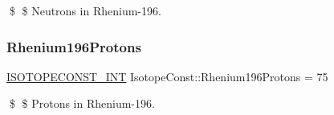 \$ \$ Neutrons in Rhenium-\/196. \mbox{\label{group___isotope_const-_rhenium-_re196_ga2de99aae8e162544e072fd8a0ebff1d1}} 
\subsubsection{\texorpdfstring{Rhenium196\+Protons}{Rhenium196Protons}}
{\footnotesize\ttfamily \mbox{\hyperlink{group___isotope_const-_macros_ga5f18360b3e99483a35c32d789e62621c}{I\+S\+O\+T\+O\+P\+E\+C\+O\+N\+S\+T\+\_\+\+I\+NT}} Isotope\+Const\+::\+Rhenium196\+Protons = 75}

\$ \$ Protons in Rhenium-\/196. 